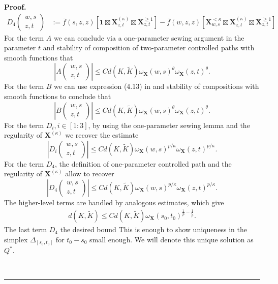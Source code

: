 \documentclass{article}%
\newenvironment{proof}[1][Proof]{\noindent\textbf{#1.} }{\ \rule{0.5em}{0.5em}}
\begin{document}
\begin{proof}
\begin{align*}
D_4\begin{pmatrix} w,s \\ z,t \end{pmatrix} &:=  \overline f(s,z,z) \left[\mathbf{1} \boxtimes \mathbf{X}^{(\kappa)}_{z,t} \boxtimes \mathbf{X}^{\geq 1}_{z,t}\right] -\overline f(w,z,z) \left[\mathbf{X}^{< \kappa}_{w,s} \boxtimes \mathbf{X}^{(\kappa)}_{z,t} \boxtimes \mathbf{X}^{\geq 1}_{z,t}\right]
\end{align*}
For the term $A$ we can conclude via a one-parameter sewing argument in the parameter $t$ and stability of composition of two-parameter controlled paths with smooth functions that 
\[
\left|A\begin{pmatrix} w,s \\ z,t \end{pmatrix}\right|
 \leq C d(K, \tilde{K}) \omega_{\mathbf{X}}(w,s)^{\theta} \omega_{\mathbf{X}}(z,t)^{\theta}.\]
For the term $B$ we can use expression (4.13) in \cite{cass2023fubini} and stability of compositions with smooth functions to conclude that 
\[
\left|B\begin{pmatrix} w,s \\ z,t \end{pmatrix}\right|
 \leq C d(K, \tilde{K}) \omega_{\mathbf{X}}(w,s)^{\theta} \omega_{\mathbf{X}}(z,t)^{\theta}.\]
For the term $D_i, i \in [1:3]$, by using the one-parameter sewing lemma and the regularity of $\mathbf{X}^{(\kappa)}$ we recover the estimate 
\[
\left|D_i\begin{pmatrix} w,s \\ z,t \end{pmatrix}\right|
 \leq C d(K, \tilde{K}) \omega_{\mathbf{X}}(w,s)^{p/\kappa} \omega_{\mathbf{X}}(z,t)^{p/\kappa}.\]
For the term $D_4$, the definition of one-parameter controlled path and the regularity of $\mathbf{X}^{(\kappa)}$ allow to recover
\[
\left|D_4\begin{pmatrix} w,s \\ z,t \end{pmatrix}\right|
 \leq C d(K, \tilde{K}) \omega_{\mathbf{X}}(w,s)^{p/\kappa} \omega_{\mathbf{X}}(z,t)^{p/\kappa}.\]
The higher-level terms are handled by analogous estimates, which give
\begin{align*}
    d(K,\tilde{K}) \leq C
    d(K,\tilde{K})  \omega_{\mathbf{X}}(s_0, t_0)^{\frac{1}{p} - \frac{1}{\tilde{p}}}.
\end{align*}
The last term $D_4$ the desired bound 
This is enough to show uniqueness in the simplex $\Delta_{[s_0, t_0]}$ for $t_0-s_0$ small enough. We will denote this unique solution as $Q^*$.\newline

\end{proof}
\end{document}
